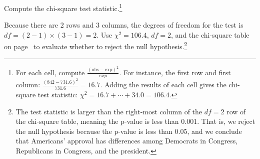 \begin{exercise}
Compute the chi-square test statistic.\footnote{For each cell, compute $\frac{(\text{obs} - \text{exp})^2}{exp}$. For instance, the first row and first column: $\frac{(842-731.6)^2}{731.6} = 16.7$. Adding the results of each cell gives the chi-square test statistic: {\scriptsize$\chi^2 = 16.7 + \cdots + 34.0 = 106.4$}.}
\end{exercise}

\begin{exercise}
Because there are 2 rows and 3 columns, the degrees of freedom for the test is $df=(2-1)\times (3-1) = 2$. Use $\chi^2=106.4$, $df=2$, and the chi-square table on page~\pageref{chiSquareProbabilityTable} to evaluate whether to reject the null hypothesis.\footnote{The test statistic is larger than the right-most column of the $df=2$ row of the chi-square table, meaning the p-value is less than 0.001. That is, we reject the null hypothesis because the p-value is less than 0.05, and we conclude that Americans' approval has differences among Democrats in Congress, Republicans in Congress, and the president.}
\end{exercise}






